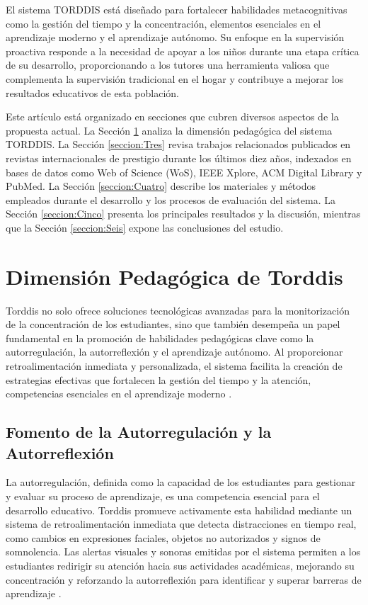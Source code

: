 \documentclass[a4paper,fleqn]{cas-sc}
\begin{document}
		El sistema TORDDIS está diseñado para fortalecer habilidades metacognitivas como la gestión del tiempo y la concentración, elementos esenciales en el aprendizaje moderno y el aprendizaje autónomo. Su enfoque en la supervisión proactiva responde a la necesidad de apoyar a los niños durante una etapa crítica de su desarrollo, proporcionando a los tutores una herramienta valiosa que complementa la supervisión tradicional en el hogar y contribuye a mejorar los resultados educativos de esta población.
		
		Este artículo está organizado en secciones que cubren diversos aspectos de la propuesta actual. La Sección \ref{seccion:Dos} analiza la dimensión pedagógica del sistema TORDDIS. La Sección \ref{seccion:Tres} revisa trabajos relacionados publicados en revistas internacionales de prestigio durante los últimos diez años, indexados en bases de datos como Web of Science (WoS), IEEE Xplore, ACM Digital Library y PubMed. La Sección \ref{seccion:Cuatro} describe los materiales y métodos empleados durante el desarrollo y los procesos de evaluación del sistema. La Sección \ref{seccion:Cinco} presenta los principales resultados y la discusión, mientras que la Sección \ref{seccion:Seis} expone las conclusiones del estudio.
				
	\section{Dimensión Pedagógica de Torddis}
	\label{seccion:Dos}
		Torddis no solo ofrece soluciones tecnológicas avanzadas para la monitorización de la concentración de los estudiantes, sino que también desempeña un papel fundamental en la promoción de habilidades pedagógicas clave como la autorregulación, la autorreflexión y el aprendizaje autónomo. Al proporcionar retroalimentación inmediata y personalizada, el sistema facilita la creación de estrategias efectivas que fortalecen la gestión del tiempo y la atención, competencias esenciales en el aprendizaje moderno \citep{Loh2025Plugging}.
		
		\subsection{Fomento de la Autorregulación y la Autorreflexión}
			La autorregulación, definida como la capacidad de los estudiantes para gestionar y evaluar su proceso de aprendizaje, es una competencia esencial para el desarrollo educativo. Torddis promueve activamente esta habilidad mediante un sistema de retroalimentación inmediata que detecta distracciones en tiempo real, como cambios en expresiones faciales, objetos no autorizados y signos de somnolencia. Las alertas visuales y sonoras emitidas por el sistema permiten a los estudiantes redirigir su atención hacia sus actividades académicas, mejorando su concentración y reforzando la autorreflexión para identificar y superar barreras de aprendizaje \citep{Ackermans2025Young,Li2024Systematic}.
		
\end{document}
